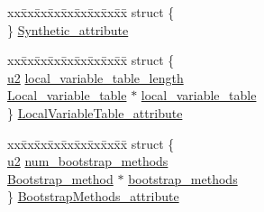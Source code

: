 \begin{DoxyCompactItemize}
\begin{tabbing}
\end{tabbing}\item 
\begin{tabbing}
xx\=xx\=xx\=xx\=xx\=xx\=xx\=xx\=xx\=\kill
struct \{\\
\} \hyperlink{unionattribute__types_a04d1c36708ba372962219177169bedf1}{Synthetic\_attribute}\\

\end{tabbing}\item 
\begin{tabbing}
xx\=xx\=xx\=xx\=xx\=xx\=xx\=xx\=xx\=\kill
struct \{\\
\>\hyperlink{structures_8h_a55ef8d87fd202b8417704c089899c5b9}{u2} \hyperlink{unionattribute__types_ab1929338658430350fa68788fddd1441}{local\_variable\_table\_length}\\
\>\hyperlink{structLocal__variable__table}{Local\_variable\_table} $\ast$ \hyperlink{unionattribute__types_af1c6811b142b955d09aba9045832bbc4}{local\_variable\_table}\\
\} \hyperlink{unionattribute__types_a14bd080c2d4d5c855107ac67c2c3627c}{LocalVariableTable\_attribute}\\

\end{tabbing}\item 
\begin{tabbing}
xx\=xx\=xx\=xx\=xx\=xx\=xx\=xx\=xx\=\kill
struct \{\\
\>\hyperlink{structures_8h_a55ef8d87fd202b8417704c089899c5b9}{u2} \hyperlink{unionattribute__types_a6a050e29dab5344fc07b1303a928b838}{num\_bootstrap\_methods}\\
\>\hyperlink{structBootstrap__method}{Bootstrap\_method} $\ast$ \hyperlink{unionattribute__types_acd21ae085be3ee8608b86c367a5408be}{bootstrap\_methods}\\
\} \hyperlink{unionattribute__types_ab7d4f09668c4f457a4a5e76d31a961e5}{BootstrapMethods\_attribute}\\


\end{tabbing}
\end{DoxyCompactItemize}
